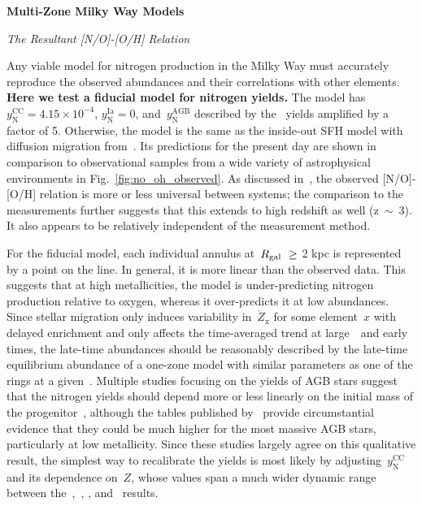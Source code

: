 \documentclass[\main/notes.tex]{subfiles}
\begin{document}
 
\begin{center} 
\textbf{{\Large Multi-Zone Milky Way Models}} 
\end{center} 

\noindent 
{\Large \textit{The Resultant [N/O]-[O/H] Relation}} 
\par\noindent 
Any viable model for nitrogen production in the Milky Way must accurately 
reproduce the observed abundances and their correlations with other elements. 
\textbf{Here we test a fiducial model for nitrogen yields.} 
The model has~$y_\text{N}^\text{CC} = 4.15\times10^{-4}$, 
$y_\text{N}^\text{Ia} = 0$, and~$y_\text{N}^\text{AGB}$ described by 
the~\citet{Cristallo2011} yields amplified by a factor of 5. 
Otherwise, the model is the same as the inside-out SFH model with diffusion 
migration from~\citet{Johnson2021}. 
Its predictions for the present day are shown in comparison to observational 
samples from a wide variety of astrophysical environments in 
Fig.~\ref{fig:no_oh_observed}. 
As discussed in~\citet{Vincenzo2016}, the observed [N/O]-[O/H] relation is more 
or less universal between systems; the comparison to the~\citet{Dopita2016} 
measurements further suggests that this extends to high redshift as well 
(z~$\sim$~3). 
It also appears to be relatively independent of the measurement method. 
\par 
For the fiducial model, each individual annulus at~$R_\text{gal}~\geq$ 2 kpc is 
represented by a point on the line. 
In general, it is more linear than the observed data. 
This suggests that at high metallicities, the model is under-predicting 
nitrogen production relative to oxygen, whereas it over-predicts it at low 
abundances. 
Since stellar migration only induces variability in~$\dot{Z}_\text{x}$ for some 
element~$x$ with delayed enrichment and only affects the time-averaged trend 
at large~\rgal~and early times, the late-time abundances should be reasonably 
described by the late-time equilibrium abundance of a one-zone model with 
similar parameters as one of the rings at a given~\rgal. 
Multiple studies focusing on the yields of AGB stars suggest that the nitrogen 
yields should depend more or less linearly on the initial mass of the 
progenitor~\citep{Cristallo2011, Ventura2013}, although the tables published 
by~\citet{Karakas2010} provide circumstantial evidence that they could be 
much higher for the most massive AGB stars, particularly at low metallicity. 
Since these studies largely agree on this qualitative result, the simplest 
way to recalibrate the yields is most likely by 
adjusting~$y_\text{N}^\text{CC}$ and its dependence on~$Z$, whose values span a 
much wider dynamic range between the~\citet{Limongi2018},~\citet{Sukhbold2018}, 
\citet*{Nomoto2013}, and~\citet{Woosley1995} results. 
\end{document}
